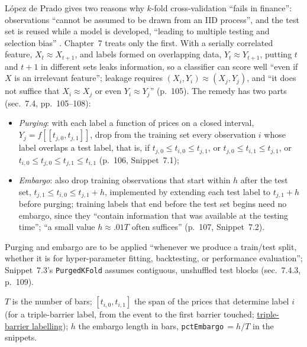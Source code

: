 \begin{qfmethod}\label{meth:purged-embargoed-cross-validation}
 López de Prado gives two reasons why $k$-fold cross-validation ``fails in finance'': observations ``cannot be assumed to be drawn from an IID process'', and the test set is reused while a model is developed, ``leading to multiple testing and selection bias'' \citep[chap.~7, sec.~7.3, p.~104]{alpha-afml}. Chapter~7 treats only the first. With a serially correlated feature, $X_t\approx X_{t+1}$, and labels formed on overlapping data, $Y_t\approx Y_{t+1}$, putting $t$ and $t+1$ in different sets leaks information, so a classifier can score well ``even if $X$ is an irrelevant feature''; leakage requires $(X_i,Y_i)\approx(X_j,Y_j)$, and ``it does not suffice that $X_i\approx X_j$ or even $Y_i\approx Y_j$'' (p.~105). The remedy has two parts (sec.~7.4, pp.~105--108):
\begin{itemize}
\item \emph{Purging}: with each label a function of prices on a closed interval, $Y_j=f[[t_{j,0},t_{j,1}]]$, drop from the training set every observation $i$ whose label overlaps a test label, that is, if $t_{j,0}\le t_{i,0}\le t_{j,1}$, or $t_{j,0}\le t_{i,1}\le t_{j,1}$, or $t_{i,0}\le t_{j,0}\le t_{j,1}\le t_{i,1}$ (p.~106, Snippet~7.1);
\item \emph{Embargo}: also drop training observations that start within $h$ after the test set, $t_{j,1}\le t_{i,0}\le t_{j,1}+h$, implemented by extending each test label to $t_{j,1}+h$ before purging; training labels that end before the test set begins need no embargo, since they ``contain information that was available at the testing time''; ``a small value $h\approx.01T$ often suffices'' (p.~107, Snippet~7.2).
\end{itemize}
Purging and embargo are to be applied ``whenever we produce a train/test split, whether it is for hyper-parameter fitting, backtesting, or performance evaluation''; Snippet~7.3's \texttt{PurgedKFold} assumes contiguous, unshuffled test blocks (sec.~7.4.3, p.~109).

 $T$ is the number of bars; $[t_{i,0},t_{i,1}]$ the span of the prices that determine label $i$ (for a triple-barrier label, from the event to the first barrier touched; \hyperref[meth:triple-barrier-labelling]{triple-barrier labelling}); $h$ the embargo length in bars, \texttt{pctEmbargo}$\,=h/T$ in the snippets.


\end{qfmethod}
